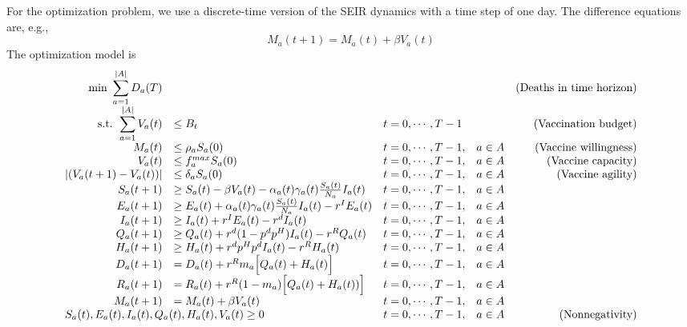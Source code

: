 \documentclass{article}
\begin{document}
For the optimization problem, we use a discrete-time version of the SEIR dynamics with a time step of one day. The difference equations are, e.g., 
\begin{equation}
    M_a(t+1) = M_a(t) + \beta V_a(t)
\end{equation}
The optimization model is
\begin{equation*}
\begin{array}{rlllr}
    \text{min     }  \displaystyle \sum_{a=1}^{|A|}D_a(T) &  & &  & \text{(Deaths in time horizon)}\\
    \text{s.t.    } \displaystyle \sum_{a=1}^{|A|}V_a(t)& \leq B_t  &t = 0,\cdots, T-1 &  &\text{(Vaccination budget)} \\
    M_a(t) &\leq \rho_a S_a(0)  & t = 0,\cdots, T-1,& a \in A &\text{(Vaccine willingness)}\\
    V_a(t) &\leq f_a^{max}S_a(0)  & t = 0,\cdots, T-1,& a \in A &\text{(Vaccine capacity)} \\
    |(V_a(t+1)-V_a(t))| &\leq \delta_aS_a(0)  & t = 0,\cdots, T-1,& a \in A &\text{(Vaccine agility)} \\
    S_a(t+1) &\geq S_a(t)  -\beta V_a(t) - \alpha_a(t) \gamma_a(t)\frac{S_a(t)}{N_a}I_a(t) & t = 0,\cdots, T-1,& a \in A\\
    E_a(t+1) &\geq E_a(t) + \alpha_a(t) \gamma_a(t)\frac{S_a(t)}{N_a}I_a(t) -r^IE_a(t)  & t = 0,\cdots, T-1,& a \in A\\
    I_a(t+1) &\geq I_a(t) + r^IE_a(t) - r^dI_a(t) & t = 0,\cdots, T-1,& a \in A\\
    Q_a(t+1) &\geq Q_a(t) + r^d(1-p^dp^H)I_a(t) - r^RQ_a(t)  & t = 0,\cdots, T-1,& a \in A\\
    H_a(t+1) &\geq H_a(t) + r^dp^Hp^dI_a(t) - r^RH_a(t) & t = 0,\cdots, T-1,& a \in A\\
    D_a(t+1) &= D_a(t) + r^Rm_a\Big[Q_a(t)+H_a(t)\Big] & t = 0,\cdots, T-1,& a \in A\\
    R_a(t+1) &= R_a(t) + r^R(1-m_a)\Big[Q_a(t)+H_a(t))\Big] & t = 0,\cdots, T-1,& a \in A\\
    M_a(t+1) &= M_a(t) +\beta V_a(t)  & t = 0,\cdots, T-1,& a \in A\\
    \multicolumn{2}{l}{S_a(t), E_a(t), I_a(t), Q_a(t), H_a(t), V_a(t) \geq 0 } & t = 0,\cdots, T-1,& a \in A &\text{(Nonnegativity)}
\end{array}
\end{equation*}
\end{document}
